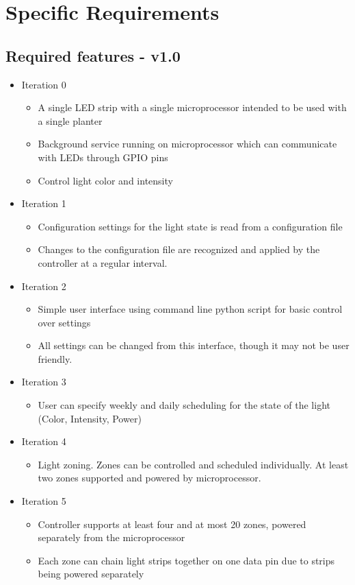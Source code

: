 \documentclass[onecolumn, draftclsnofoot,10pt, compsoc]{IEEEtran}
\begin{document}
	\section*{Specific Requirements}
		\subsection*{Required features - v1.0}
			\begin{itemize}
				\item Iteration 0
						\begin{itemize}
						\item A single LED strip with a single microprocessor intended to be used with a single planter
						\item Background service running on microprocessor which can communicate with LEDs through GPIO pins
						\item Control light color and intensity
					\end{itemize}
						\item Iteration 1
					\begin{itemize}
						\item Configuration settings for the light state is read from a configuration file
						\item Changes to the configuration file are recognized and applied by the controller at a regular interval.
					\end{itemize}

				\item Iteration 2
					\begin{itemize}
						\item Simple user interface using command line python script for basic control over settings
						\item All settings can be changed from this interface, though it may not be user friendly.
					\end{itemize}
				\item Iteration 3
					\begin{itemize}
						\item User can specify weekly and daily scheduling for the state of the light (Color, Intensity, Power)
					\end{itemize}
				\item Iteration 4
					\begin{itemize}
						\item  Light zoning. Zones can be controlled and scheduled individually. At least two zones supported and powered by microprocessor.
					\end{itemize}
				\item Iteration 5
					\begin{itemize}
						\item Controller supports at least four and at most 20 zones, powered separately from the microprocessor
						\item Each zone can chain light strips together on one data pin due to strips being powered separately
					\end{itemize}
			\end{itemize}
\end{document}
